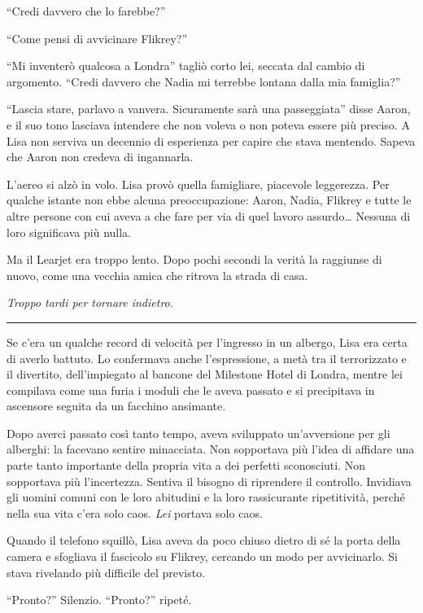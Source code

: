 \documentclass[a4paper,oneside,11pt]{memoir}
\begin{document}
``Credi davvero che lo farebbe?''

``Come pensi di avvicinare Flikrey?''

``Mi inventerò qualcosa a Londra'' tagliò corto lei, seccata dal cambio di
argomento. ``Credi davvero che Nadia mi terrebbe lontana dalla mia famiglia?''

``Lascia stare, parlavo a vanvera. Sicuramente sarà una passeggiata'' disse
Aaron, e il suo tono lasciava intendere che non voleva o non poteva essere più
preciso. A Lisa non serviva un decennio di esperienza per capire che stava
mentendo. Sapeva che Aaron non credeva di ingannarla.

L'aereo si alzò in volo. Lisa provò quella famigliare, piacevole leggerezza. Per
qualche istante non ebbe alcuna preoccupazione: Aaron, Nadia, Flikrey e tutte le
altre persone con cui aveva a che fare per via di quel lavoro assurdo\dots{}
Nessuna di loro significava più nulla.

Ma il Learjet era troppo lento. Dopo pochi secondi la verità la raggiunse di
nuovo, come una vecchia amica che ritrova la strada di casa.

\emph{Troppo tardi per tornare indietro.}

\plainbreak{1}

Se c'era un qualche record di velocità per l'ingresso in un albergo, Lisa era
certa di averlo battuto. Lo confermava anche l'espressione, a metà tra il
terrorizzato e il divertito, dell'impiegato al bancone del Milestone Hotel di
Londra, mentre lei compilava come una furia i moduli che le aveva passato e si
precipitava in ascensore seguita da un facchino ansimante.

Dopo averci passato così tanto tempo, aveva sviluppato un'avversione per gli
alberghi: la facevano sentire minacciata. Non sopportava più l'idea di affidare
una parte tanto importante della propria vita a dei perfetti sconosciuti. Non
sopportava più l'incertezza. Sentiva il bisogno di riprendere il controllo.
Invidiava gli uomini comuni con le loro abitudini e la loro rassicurante
ripetitività, perché nella sua vita c'era solo caos. \emph{Lei} portava solo
caos.


Quando il telefono squillò, Lisa aveva da poco chiuso dietro di sé la porta
della camera e sfogliava il fascicolo su Flikrey, cercando un modo per
avvicinarlo. Si stava rivelando più difficile del previsto.

``Pronto?'' Silenzio. ``Pronto?'' ripeté.
\end{document}
